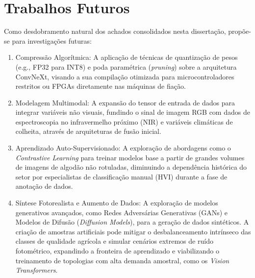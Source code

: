 \section{Trabalhos Futuros}
\label{sec:trabalhos_futuros}

Como desdobramento natural dos achados consolidados nesta dissertação, propõe-se para investigações futuras:
\begin{enumerate}
    \item Compressão Algorítmica: A aplicação de técnicas de quantização de pesos (e.g., FP32 para INT8) e poda paramétrica (\textit{pruning}) sobre a arquitetura ConvNeXt, visando a sua compilação otimizada para microcontroladores restritos ou FPGAs diretamente nas máquinas de fiação.
    \item Modelagem Multimodal: A expansão do tensor de entrada de dados para integrar variáveis não visuais, fundindo o sinal de imagem RGB com dados de espectroscopia no infravermelho próximo (NIR) e variáveis climáticas de colheita, através de arquiteturas de fusão inicial.
    \item Aprendizado Auto-Supervisionado: A exploração de abordagens como o \textit{Contrastive Learning} para treinar modelos base a partir de grandes volumes de imagens de algodão não rotuladas, diminuindo a dependência histórica do setor por especialistas de classificação manual (HVI) durante a fase de anotação de dados.
    \item Síntese Fotorealista e Aumento de Dados: A exploração de modelos generativos avançados, como Redes Adversárias Generativas (GANs) e Modelos de Difusão (\textit{Diffusion Models}), para a geração de dados sintéticos. A criação de amostras artificiais pode mitigar o desbalanceamento intrínseco das classes de qualidade agrícola e simular cenários extremos de ruído fotométrico, expandindo a fronteira de aprendizado e viabilizando o treinamento de topologias com alta demanda amostral, como os \textit{Vision Transformers}.
\end{enumerate}